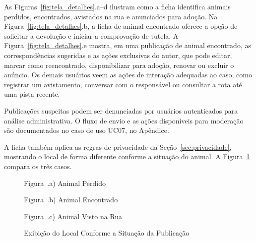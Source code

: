 As Figuras~\ref{fig:tela_detalhes}.a--d ilustram como a ficha identifica animais perdidos, encontrados, avistados na rua e anunciados para adoção. Na Figura~\ref{fig:tela_detalhes}.b, a ficha de animal encontrado oferece a opção de solicitar a devolução e iniciar a comprovação de tutela. A Figura~\ref{fig:tela_detalhes}.e mostra, em uma publicação de animal encontrado, as correspondências sugeridas e as ações exclusivas do autor, que pode editar, marcar como reencontrado, disponibilizar para adoção, renovar ou excluir o anúncio. Os demais usuários veem as ações de interação adequadas ao caso, como registrar um avistamento, conversar com o responsável ou consultar a rota até uma pista recente.

Publicações suspeitas podem ser denunciadas por usuários autenticados para análise administrativa. O fluxo de envio e as ações disponíveis para moderação são documentados no caso de uso UC07, no Apêndice.

A ficha também aplica as regras de privacidade da Seção~\ref{sec:privacidade}, mostrando o local de forma diferente conforme a situação do animal. A Figura~\ref{fig:tela_localizacao} compara os três casos.

\begin{figure}[H]
    \centering
    \caption{Exibição do Local Conforme a Situação da Publicação}
    \label{fig:tela_localizacao}
    \vspace{0.15cm}
    \begin{minipage}[t]{0.31\textwidth}
        \centering
        \par\vspace{0.12cm}
        {\small Figura~\thefigure.a) Animal Perdido}
    \end{minipage}
    \hfill
    \begin{minipage}[t]{0.31\textwidth}
        \centering
        \par\vspace{0.12cm}
        {\small Figura~\thefigure.b) Animal Encontrado}
    \end{minipage}
    \hfill
    \begin{minipage}[t]{0.31\textwidth}
        \centering
        \par\vspace{0.12cm}
        {\small Figura~\thefigure.c) Animal Visto na Rua}
    \end{minipage}
    \par\vspace{0.12cm}
\end{figure}

